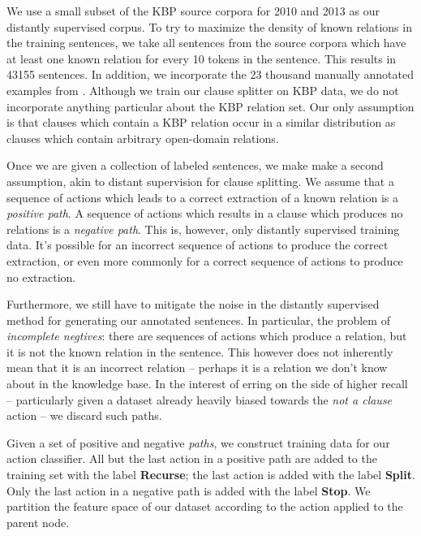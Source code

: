 We use a small subset of the KBP source corpora for 
  2010 \cite{key:2010ji-kbpoverview}
  and 2013 \cite{key:2013surdeanu-kbpoverview}
  as our distantly supervised corpus.
To try to maximize the density of known relations in the training sentences,
  we take all sentences from the source corpora which have at least one known
  relation for every 10 tokens in the sentence.
This results in \num{43155} sentences.
In addition, we incorporate the 23 thousand manually annotated examples
  from .
Although we train our clause splitter on KBP data, we do not incorporate
  anything particular about the KBP relation set.
Our only assumption is that clauses which contain a KBP relation occur in
  a similar distribution as clauses which contain arbitrary open-domain
  relations.

Once we are given a collection of labeled sentences, we make make a second
  assumption, akin to distant supervision for clause splitting.
We assume that a sequence of actions which leads to a correct extraction of
  a known relation is a \textit{positive path}.
A sequence of actions which results in a clause which produces no relations
  is a \textit{negative path}.
This is, however, only distantly supervised training data.
It's possible for an incorrect sequence of actions to produce the correct
  extraction, or even more commonly for a correct sequence of actions to 
  produce no extraction.

Furthermore, we still have to mitigate the noise in the distantly supervised
  method for generating our annotated sentences.
In particular, the problem of \textit{incomplete negtives}: there are sequences
  of actions which produce a relation, but it is not the known relation in the
  sentence.\needcite
This however does not inherently mean that it is an incorrect relation -- perhaps
  it is a relation we don't know about in the knowledge base.
In the interest of erring on the side of higher recall -- particularly given
  a dataset already heavily biased towards the \textit{not a clause} action --
  we discard such paths.

Given a set of positive and negative \textit{paths}, we construct training
  data for our action classifier.
All but the last action in a positive path are added to the training set
  with the label \textbf{Recurse}; the last action is added with the label
  \textbf{Split}.
Only the last action in a negative path is added with the label \textbf{Stop}.
We partition the feature space of our dataset according to the action
  applied to the parent node.

